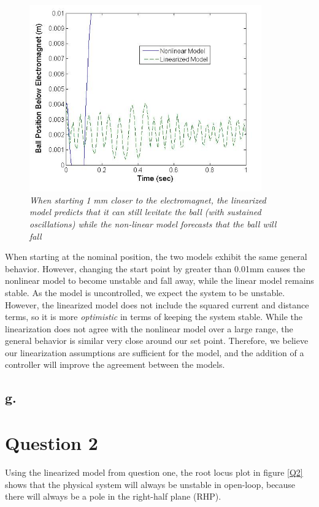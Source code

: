 \documentclass{article}
\theoremstyle{plain}
\theoremstyle{definition}
\theoremstyle{remark}
\begin{document}
\begin{figure}[htb]
\begin{center}
\includegraphics[width = 10cm]{Part1fFarDisturbance.jpg}
\caption{\emph{When starting 1 mm closer to the electromagnet, the linearized model predicts that it can still levitate the ball (with sustained oscillations) while the non-linear model forecasts that the ball will fall}}
\label{Q1_f3}
\end{center}
\end{figure}

When starting at the nominal position, the two models exhibit the same general behavior. However, changing the start point by greater than 0.01mm causes the nonlinear model to become unstable and fall away, while the linear model remains stable.  As the model is uncontrolled, we expect the system to be unstable. However, the linearized model does not include the squared current and distance terms, so it is more \emph{optimistic} in terms of keeping the system stable. While the linearization does not agree with the nonlinear model over a large range, the general behavior is similar very close around our set point. Therefore, we believe our linearization assumptions are sufficient for the model, and the addition of a controller will improve the agreement between the models.

\subsection*{g.}

\section*{Question 2}
Using the linearized model from question one, the root locus plot in figure \ref{Q2} shows that the physical system will always be unstable in open-loop, because there will always be a pole in the right-half plane (RHP).\\
\end{document}
